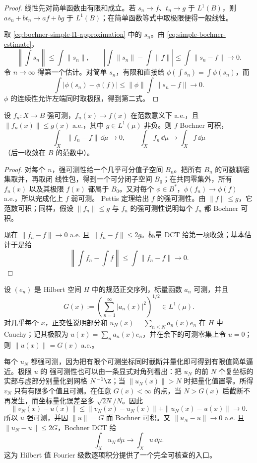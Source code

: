 \begin{proof}
线性先对简单函数由有限和成立。若 $s_n\to f$、$t_n\to g$ 于 $L^1(B)$，则
$as_n+bt_n\to af+bg$ 于 $L^1(B)$；在简单函数等式中取极限便得一般线性。

取 \eqref{eq:bochner-simple-l1-approximation} 中的 $s_n$。由
\eqref{eq:simple-bochner-estimate}，
\[
 \left\|\int s_n\right\|\le\int\|s_n\|,
 \qquad
 \left|\int\|s_n\|-\int\|f\|\right|
 \le\int\|s_n-f\|\longrightarrow0.
\]
令 $n\to\infty$ 得第一个估计。对简单 $s_n$，有限和直接给
$\phi(\int s_n)=\int\phi(s_n)$，而
\[
 \int|\phi(s_n)-\phi(f)|
 \le\|\phi\|\int\|s_n-f\|\longrightarrow0.
\]
$\phi$ 的连续性允许左端同时取极限，得到第二式。
\end{proof}

\begin{theorem}\label{theorem:3-4-2-3}
设 $f_n:X\to B$ 强可测，$f_n(x)\to f(x)$ 在范数意义下 a.e.，且
$\|f_n(x)\|\le g(x)$ a.e.，其中 $g\in L^1(\mu)$ 非负。则 $f$ Bochner 可积，
\[
 \int_X\|f_n-f\|\,\dd\mu\longrightarrow0,
 \qquad
 \int_Xf_n\,\dd\mu\longrightarrow\int_Xf\,\dd\mu
\]
（后一收敛在 $B$ 的范数中）。
\end{theorem}

\begin{proof}
对每个 $n$，强可测性给一个几乎可分值子空间 $B_n$。把所有 $B_n$ 的可数稠密集取并，再取闭
线性包，得到一个可分闭子空间 $B_0$；在共同零集外，所有 $f_n(x)$ 以及其极限 $f(x)$ 都属于
$B_0$。又对每个 $\phi\in B^*$，$\phi(f_n)\to\phi(f)$ a.e.，所以完成化上 $f$ 弱可测。
Pettis 定理给出 $f$ 的强可测性。由 $\|f\|\le g$，它范数可积；同样，假设
$\|f_n\|\le g$ 与 $f_n$ 的强可测性说明每个 $f_n$ 都 Bochner 可积。

现在 $\|f_n-f\|\to0$ a.e. 且 $\|f_n-f\|\le2g$。标量 DCT 给第一项收敛；基本估计于是给
\[
 \left\|\int f_n-\int f\right\|
 \le\int\|f_n-f\|\longrightarrow0.
\]
\end{proof}

\begin{example}\label{ex:3-4-2-1}
设 $(e_n)$ 是 Hilbert 空间 $H$ 中的规范正交序列，标量函数 $a_n$ 可测，并且
\[
 G(x):=\left(\sum_{n=1}^{\infty}|a_n(x)|^2\right)^{1/2}\in L^1(\mu).
\]
对几乎每个 $x$，正交性说明部分和
$u_N(x)=\sum_{n\le N}a_n(x)e_n$ 在 $H$ 中 Cauchy；记其极限为
$u(x)=\sum_na_n(x)e_n$，并在余下的可测零集上令 $u=0$；则 $\|u(x)\|=G(x)$ a.e.。

每个 $u_N$ 都强可测，因为把有限个可测坐标同时截断并量化即可得到有限值简单逼近。极限 $u$ 的
强可测性也可以由一条显式对角列看出：把 $u_N$ 的前 $N$ 个复坐标的实部与虚部分别量化到网格
$N^{-1}\Z$；当 $\|u_N(x)\|>N$ 时把量化值置零。所得 $v_N$ 只有有限多个值且可测。在任意
$G(x)<\infty$ 的点，当 $N>G(x)$ 后截断不再发生，而坐标量化误差至多
$\sqrt{2N}/N$。因此
\[
 \|v_N(x)-u(x)\|
 \le\|v_N(x)-u_N(x)\|+\|u_N(x)-u(x)\|\longrightarrow0.
\]
所以 $u$ 强可测，并因 $\|u\|=G$ 而 Bochner 可积。又
$\|u_N-u\|\to0$ a.e. 且 $\|u_N-u\|\le2G$，Bochner DCT 给
\[
 \int_Xu_N\,\dd\mu\longrightarrow\int_Xu\,\dd\mu.
\]
这为 Hilbert 值 Fourier 级数逐项积分提供了一个完全可核查的入口。
\end{example}

